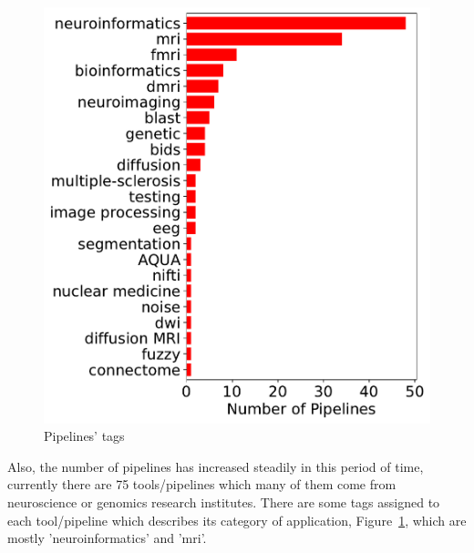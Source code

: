 \begin{figure}
    \centering
    \includegraphics[width=\textwidth,height=\textheight,keepaspectratio]{figures/Pipelines Tag.pdf}
    \caption{Pipelines' tags }
    \label{fig:pipelineTags}
\end{figure}



Also, the number of pipelines has increased steadily in this period of time, currently there are 75 tools/pipelines which many of them come from neuroscience or genomics research institutes. There are some tags assigned to each tool/pipeline which describes its category of application, Figure~\ref{fig:pipelineTags}, which are mostly 'neuroinformatics' and 'mri'.

